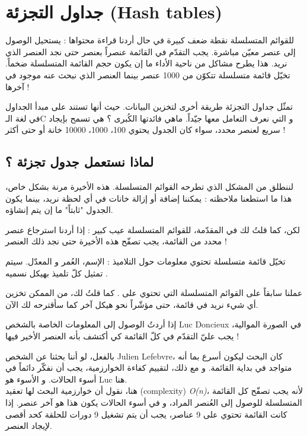\chapter{جداول التجزئة (\textenglish{Hash tables})}

للقوائم المتسلسلة نقطة ضعف كبيرة في حال أردنا قراءة محتواها : يستحيل الوصول إلى عنصر معيّن مباشرة. يجب التقدّم في القائمة عنصراً بعنصر حتى نجد العنصر الذي نريد. هذا يطرح مشاكل من ناحية الأداء ما إن يكون حجم القائمة المتسلسلة ضخماً. تخيّل قائمة متسلسلة تتكوّن من 1000 عنصر بينما العنصر الذي نبحث عنه موجود في آخرها !

تمثّل جداول التجزئة طريقة أخرى لتخزين البيانات. حيث أنها تستند على مبدأ الجداول في لغة الـ\textenglish{C}
و التي نعرف التعامل معها جيّداً. ماهي فائدتها الكُبرى ؟ هي تسمح بإيجاد سريع لعنصر محدد، سواء كان الجدول يحتوي 100، 1000، 10000 خانة أو حتى أكثر !

\section{لماذا نستعمل جدول تجزئة ؟}

لننطلق من المشكل الذي تطرحه القوائم المتسلسلة. هذه الأخيرة مرنة بشكل خاص، هذا ما استطعنا ملاحظته : يمكننا إضافة أو إزالة خانات في أي لحظة نريد، بينما يكون الجدول "ثابتاً" ما إن يتم إنشاؤه.

لكن، كما قلتُ لك في المقدّمة، للقوائم المتسلسلة عيب كبير : إذا أردنا استرجاع عنصر محدد من القائمة، يجب تصفّح هذه الأخيرة حتى نجد ذلك العنصر !

تخيّل قائمة متسلسلة تحتوي معلومات حول التلاميذ : الإسم، العُمر و المعدّل. سيتم تمثيل كلّ تلميذ بهيكل نسميه
.

\begin{information}
عملنا سابقاً على القوائم المتسلسلة التي تحتوي على
.
 كما قلتُ لك، من الممكن تخزين أي شيء نريد في قائمة، حتى مؤشّراً نحو هيكل آخر كما سأقترحه لك الآن.
\end{information}

 إذا أردتُ الوصول إلى المعلومات الخاصة بالشخص
\textenglish{Luc Doncieux}
 في الصورة الموالية، يجب عليّ التقدّم في كلّ القائمة كي أكتشف بأنه العنصر الأخير فيها !
 

\begin{information}
بالفعل، لو أننا بحثنا عن الشخص 
\textenglish{Julien Lefebvre}،
كان البحث ليكون أسرع بما أنه متواجد في بداية القائمة. و مع ذلك، لتقييم كفاءة الخوارزمية، يجب أن نفكّر دائماً في أسوء الحالات. و الأسوء هو
\textenglish{Luc}
هنا.\\
هنا، نقول أن خوارزمية البحث لها تعقيد
(\textenglish{complexity})
\textit{\textenglish{O(n)}}،
لأنه يجب تصفّح كل القائمة المتسلسلة للوصول إلى العُنصر المراد، و في أسوء الحالات يكون هذا هو آخر عنصر. إذا كانت القائمة تحتوي على 9 عناصر، يجب أن يتم تشغيل 9 دورات للحلقة كحد أقصى لإيجاد العنصر.
\end{information}

